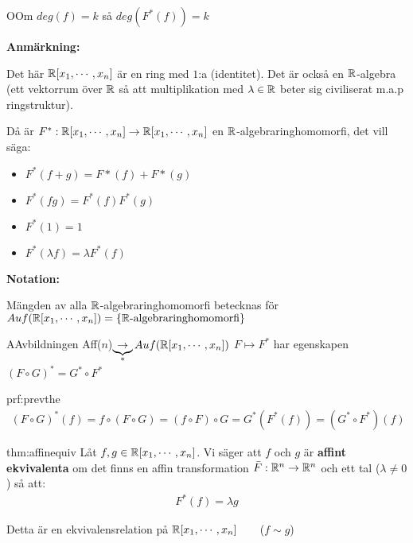 \par\bigskip
\begin{theo}
  OOm $deg(f) =k$ så $deg(F^*(f))=k$
\end{theo}
\par\bigskip
\noindent\textbf{Anmärkning:}\par
\noindent Det här $\mathbb{R}[x_1,\cdots,x_n]$ är en ring med $1$:a (identitet). Det är också en $\mathbb{R}$-algebra (ett vektorrum över $\mathbb{R}$ så att multiplikation med $\lambda\in\mathbb{R}$ beter sig civiliserat m.a.p ringstruktur).
\par\bigskip
\noindent Då är $F^*:\mathbb{R}[x_1,\cdots,x_n]\to\mathbb{R}[x_1,\cdots,x_n]$ en $\mathbb{R}$-algebraringhomomorfi, det vill säga:
\begin{itemize}
  \item $F^*(f+g) = F*(f)+F*(g)$
  \item $F^*(fg) = F^*(f)F^*(g)$
  \item $F^*(1) = 1$
  \item $F^*(\lambda f) = \lambda F^*(f)$
\end{itemize}
\par\bigskip
\noindent\textbf{Notation:}\par
\noindent Mängden av alla $\mathbb{R}$-algebraringhomomorfi betecknas för $Auf(\mathbb{R}[x_1,\cdots,x_n]) = \{\mathbb{R}\text{-algebraringhomomorfi}\}$
\par\bigskip
\begin{theo}
  AAvbildningen Aff($n$)$\underbrace{\to}_{\text{*}}Auf(\mathbb{R}[x_1,\cdots,x_n])$ $F\mapsto F^*$ har egenskapen $(F\circ G)^* = G^*\circ F^*$
\end{theo}
\par\bigskip
\begin{prf}{prf:prevthe}
  \begin{equation*}
    \begin{gathered}
      (F\circ G)^*(f) = f\circ (F\circ G) = (f\circ F)\circ G = G^*(F^*(f)) = (G^*\circ F^*)(f)
    \end{gathered}
  \end{equation*}
\end{prf}
\par\bigskip
\begin{theo}{thm:affinequiv}
  Låt $f,g\in\mathbb{R}[x_1,\cdots,x_n]$. Vi säger att $f$ och $g$ är \textbf{affint ekvivalenta} om det finns en affin transformation $\bar{F}:\mathbb{R}^n\to\mathbb{R}^n$ och ett tal ($\lambda\neq0$) så att:
  \begin{equation*}
    \begin{gathered}
      F^*(f) = \lambda g
    \end{gathered}
  \end{equation*}
  \par\bigskip
  \noindent Detta är en ekvivalensrelation på $\mathbb{R}[x_1,\cdots,x_n]$$\qquad$($f\sim g$)
\end{theo}
\newpage
